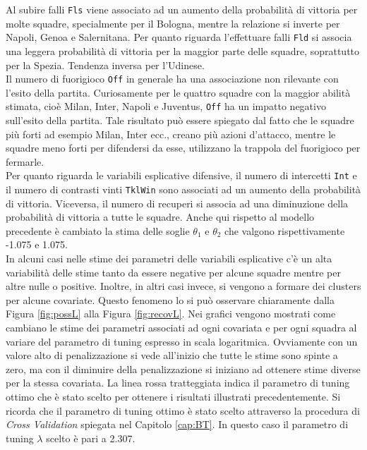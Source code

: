 Al subire falli \texttt{Fls} viene associato ad un aumento della probabilità di vittoria per molte squadre, specialmente per il Bologna, mentre la relazione si inverte per Napoli, Genoa e Salernitana. Per quanto riguarda l'effettuare falli \texttt{Fld} si associa una leggera probabilità di vittoria per la maggior parte delle squadre, soprattutto per la Spezia. Tendenza inversa per l'Udinese.\\
Il numero di fuorigioco \texttt{Off} in generale ha una associazione non rilevante con l'esito della partita. Curiosamente per le quattro squadre con la maggior abilità stimata, cioè Milan, Inter, Napoli e Juventus, \texttt{Off} ha un impatto negativo sull'esito della partita. Tale risultato può essere spiegato dal fatto che le squadre più forti ad esempio Milan, Inter ecc., creano più azioni d'attacco, mentre le squadre meno forti per difendersi da esse, utilizzano la trappola del fuorigioco per fermarle.\\





Per quanto riguarda le variabili esplicative difensive, il numero di intercetti \texttt{Int} e il numero di contrasti vinti \texttt{TklWin} sono associati ad un aumento della probabilità di vittoria. Viceversa, il numero di recuperi si associa ad una diminuzione della probabilità di vittoria a tutte le squadre. Anche qui rispetto al modello precedente è cambiato la stima delle soglie $\theta_1$ e $\theta_2$ che valgono rispettivamente -1.075 e 1.075.\\
In alcuni casi nelle stime dei parametri delle variabili esplicative c'è un alta variabilità delle stime tanto da essere negative per alcune squadre mentre per altre nulle o positive. Inoltre, in altri casi invece, si vengono a formare dei clusters per alcune covariate. Questo fenomeno lo si può osservare chiaramente dalla Figura \ref{fig:possL} alla Figura \ref{fig:recovL}. Nei grafici vengono mostrati come cambiano le stime dei parametri associati ad ogni covariata e per ogni squadra al variare del parametro di tuning espresso in scala logaritmica. Ovviamente con un valore alto di penalizzazione si vede all'inizio che tutte le stime sono spinte a zero, ma con il diminuire della penalizzazione si iniziano ad ottenere stime diverse per la stessa covariata. La linea rossa tratteggiata indica il parametro di tuning ottimo che è stato scelto per ottenere i risultati illustrati precedentemente. Si ricorda che il parametro di tuning ottimo è stato scelto attraverso la procedura di \emph{Cross Validation} spiegata nel Capitolo \ref{cap:BT}. In questo caso il parametro di tuning $\lambda$ scelto è pari a 2.307.\\

